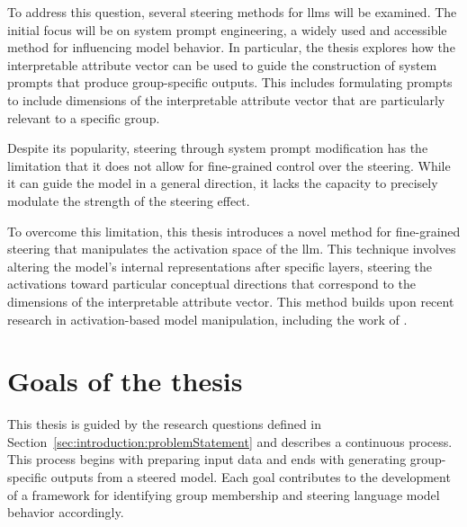 
To address this question, several steering methods for \acp{llm} will be examined. The initial focus will be on system prompt engineering, a widely used and accessible method for influencing model behavior. In particular, the thesis explores how the interpretable attribute vector can be used to guide the construction of system prompts that produce group-specific outputs. This includes formulating prompts to include dimensions of the interpretable attribute vector that are particularly relevant to a specific group.


Despite its popularity, steering through system prompt modification has the limitation that it does not allow for fine-grained control over the steering. While it can guide the model in a general direction, it lacks the capacity to precisely modulate the strength of the steering effect.

To overcome this limitation, this thesis introduces a novel method for fine-grained steering that manipulates the activation space of the \ac{llm}. This technique involves altering the model's internal representations after specific layers, steering the activations toward particular conceptual directions that correspond to the dimensions of the interpretable attribute vector. This method builds upon recent research in activation-based model manipulation, including the work of \citet{konenStyleVectorsSteering2024,turnerActivationAdditionSteering2024,rimsky-etal-2024-steering}.



\section{Goals of the thesis}
\label{sec:introduction:goals}
\newlength{\maxstretch}
\setlength{\maxstretch}{0pt plus 1fill}
This thesis is guided by the research questions defined in Section~\ref{sec:introduction:problemStatement} and describes a continuous process. This process begins with preparing input data and ends with generating group-specific outputs from a steered model. Each goal contributes to the development of a framework for identifying group membership and steering language model behavior accordingly.

